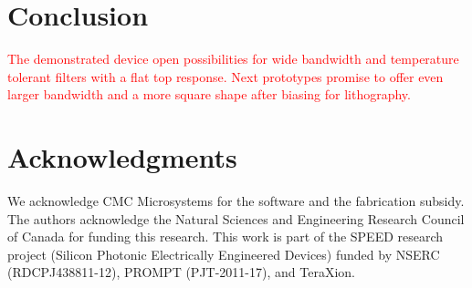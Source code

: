 \documentclass[letterpaper,10pt]{article}
\newcommand\todo[1]{\textcolor{red}{#1}}
\begin{document}
\section{Conclusion}
\todo{The demonstrated device open possibilities for wide bandwidth and temperature tolerant filters with a flat top response. Next prototypes promise to offer even larger bandwidth and a more square shape after biasing for lithography.}













\section*{Acknowledgments}
We acknowledge CMC Microsystems for the  software and the fabrication subsidy. The authors acknowledge the Natural Sciences and Engineering Research Council of Canada for funding this research. This work is part of the SPEED research project (Silicon Photonic Electrically Engineered Devices) funded by NSERC (RDCPJ438811-12), PROMPT (PJT-2011-17), and TeraXion.



\end{document}

